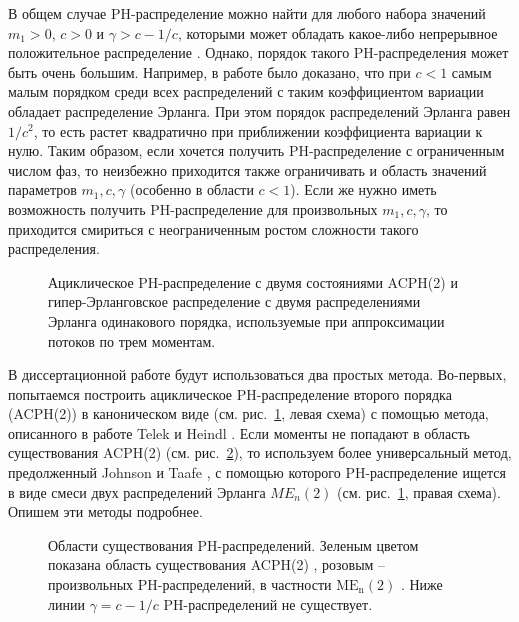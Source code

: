 В общем случае PH-распределение можно найти для любого набора значений $m_1 > 0$, $c > 0$ и $\gamma > c - 1/c$, которыми может обладать какое-либо непрерывное положительное распределение \cite{Johnson1989}. Однако, порядок такого PH-распределения может быть очень большим. Например, в работе \cite{Aldous1987} было доказано, что при $c < 1$ самым малым порядком среди всех распределений с таким коэффициентом вариации  обладает распределение Эрланга. При этом порядок распределений Эрланга равен $1 / c^2$, то есть растет квадратично при приближении коэффициента вариации к нулю. Таким образом, если хочется получить PH-распределение с ограниченным числом фаз, то неизбежно приходится также ограничивать и область значений параметров $m_1, c, \gamma$ (особенно в области $c < 1$). Если же нужно иметь возможность получить PH-распределение для произвольных $m_1, c, \gamma$, то приходится смириться с неограниченным ростом сложности такого распределения.

\begin{figure}[h]
  \caption{Ациклическое PH-распределение с двумя состояниями ACPH(2) и гипер-Эрланговское распределение с двумя распределениями Эрланга одинакового порядка, используемые при аппроксимации потоков по трем моментам.}
  \label{fig:ch4_ph3}
\end{figure}

В диссертационной работе будут использоваться два простых метода. Во-первых, попытаемся построить ациклическое PH-распределение второго порядка (ACPH(2)) в каноническом виде (см. рис.~\ref{fig:ch4_ph3}, левая схема) с помощью метода, описанного в работе Telek и Heindl \cite{Telek2003}. Если моменты не попадают в область существования ACPH(2) (см. рис.~\ref{fig:ch4_ph_feasible_regions}), то используем более универсальный метод, предолженный Johnson и Taafe \cite{Johnson1989}, с помощью которого PH-распределение ищется в виде смеси двух распределений Эрланга $ME_n(2)$ (см. рис.~\ref{fig:ch4_ph3}, правая схема). Опишем эти методы подробнее.

\begin{figure}[h]
  \caption{Области существования PH-распределений. Зеленым цветом показана область существования ACPH(2) \cite{Telek2003}, розовым -- произвольных PH-распределений, в частности $\text{ME}_\text{n}(2)$ \cite{Johnson1989}. Ниже линии $\gamma = c - 1/c$ PH-распределений не существует.}
  \label{fig:ch4_ph_feasible_regions}
\end{figure}

